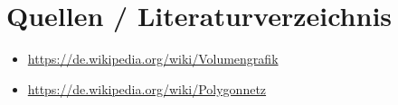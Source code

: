 \section{Quellen / Literaturverzeichnis}

\begin{itemize}
	\item \url{https://de.wikipedia.org/wiki/Volumengrafik}
	\item \url{https://de.wikipedia.org/wiki/Polygonnetz}
\end{itemize}

